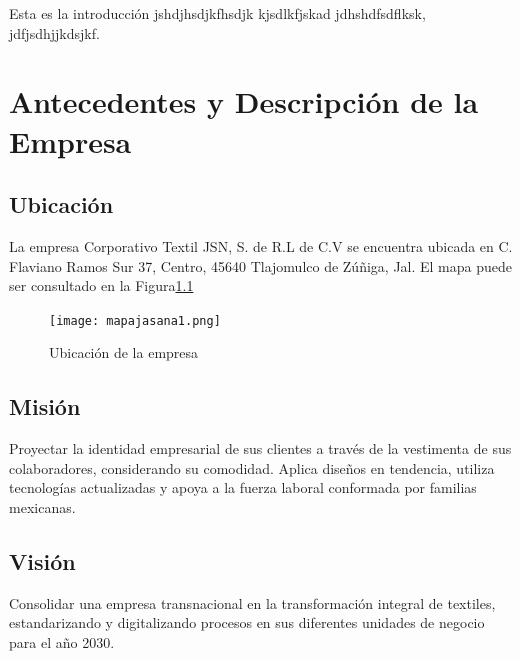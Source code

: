 \documentclass[12pt,letterpaper,spanish]{report}
\begin{document}
Esta es la introducción jshdjhsdjkfhsdjk kjsdlkfjskad jdhshdfsdflksk, jdfjsdhjjkdsjkf.



\chapter{Antecedentes y Descripción de la Empresa}
\newpage




\section{Ubicación}
La empresa Corporativo Textil JSN, S. de R.L de C.V se encuentra ubicada en C. Flaviano Ramos Sur 37, Centro, 45640 Tlajomulco de Zúñiga, Jal. El mapa puede ser consultado en la Figura\ref{a01}

\begin{figure}[htp]
  \centering
  \texttt{[image: mapajasana1.png]}
  \caption{Ubicación de la empresa}\label{a01}
\end{figure}




\section{Misión}
Proyectar la identidad empresarial de sus clientes a través de la vestimenta de sus colaboradores, considerando su comodidad. Aplica diseños en tendencia, utiliza tecnologías actualizadas y apoya a la fuerza laboral conformada por familias mexicanas.

\section{Visión}
Consolidar una empresa transnacional en la transformación integral de textiles, estandarizando y digitalizando procesos en sus diferentes unidades de negocio para el año 2030.
\end{document}
